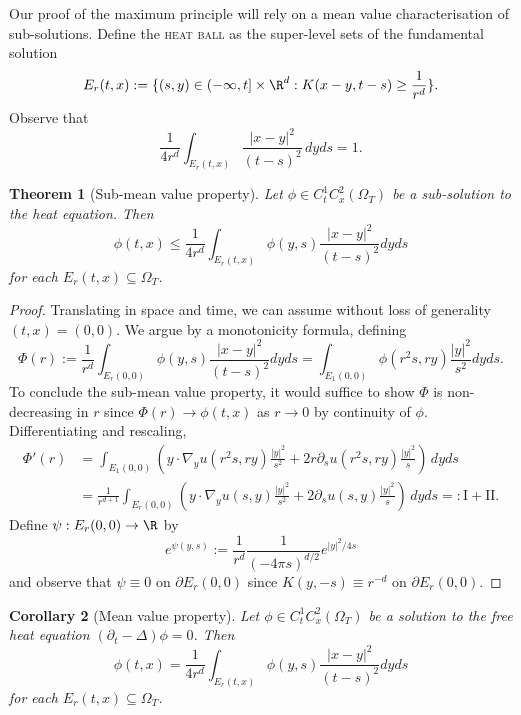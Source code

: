 \documentclass[reqno]{amsart}
\newtheorem{theorem}{Theorem}
\newtheorem{corollary}[theorem]{Corollary}
\theoremstyle{definition}
\theoremstyle{remark}
\renewcommand{\emph}{\textsc}
\begin{document}
Our proof of the maximum principle will rely on a mean value characterisation of sub-solutions. Define the \emph{heat ball} as the super-level sets of the fundamental solution 
	\[ E_r (t, x) := \{ (s, y) \in (-\infty, t] \times \R^d : K(x - y, t - s) \geq \frac{1}{r^d} \}. \]
Observe that 
	\[ \frac{1}{4r^d}\int_{E_r (t, x)} \frac{|x - y|^2}{(t - s)^2} \, dy ds = 1. \]	

\begin{theorem}[Sub-mean value property]
	Let $\phi \in C^1_t C^2_x (\Omega_T)$ be a sub-solution to the heat equation. Then 
		\[ \phi(t, x) \leq \frac{1}{4r^d} \int_{E_r (t, x)} \phi(y, s) \frac{|x - y|^2}{(t - s)^2} dy ds \]
	for each $E_{r} (t, x) \subseteq \Omega_T$. 	
\end{theorem}

\begin{proof}
	Translating in space and time, we can assume without loss of generality $(t, x) = (0, 0)$. We argue by a monotonicity formula, defining
		\[ \Phi(r) := \frac{1}{r^d} \int_{E_r (0, 0)} \phi(y, s) \frac{|x - y|^2}{(t - s)^2} dy ds = \int_{E_1 (0, 0)} \phi(r^2 s, ry) \frac{|y|^2}{s^2} dy ds . \]
	To conclude the sub-mean value property, it would suffice to show $\Phi$ is non-decreasing in $r$ since $\Phi(r) \to \phi(t, x)$ as $r \to 0$ by continuity of $\phi$. Differentiating and rescaling,
		\begin{align*}
			\Phi'(r)
				&= \int_{E_1 (0, 0)} \left(y \cdot \nabla_y u (r^2 s, r y)   \frac{|y|^2}{s^2} + 2r \partial_s u (r^2 s, ry)  \frac{|y|^2}{s}\right)  \, dy ds \\
				&= \frac{1}{r^{d + 1}} \int_{E_r (0, 0)} \left(y \cdot \nabla_y u (s, y) \frac{|y|^2}{s^2}  + 2 \partial_s u (s, y) \frac{|y|^2}{s}  \right) \, dy ds =: \text{I} + \text{II}.
		\end{align*}
	Define $\psi : E_r (0, 0) \to \R$ by 
		\[ e^{\psi (y, s)} := \frac{1}{r^d} \frac{1}{(-4\pi s)^{d/2}} e^{|y|^2/4s}\]
	and observe that $\psi \equiv 0$ on $\partial E_r (0, 0)$ since $K(y, -s) \equiv r^{-d}$ on $\partial E_r (0, 0)$. 
\end{proof}

\begin{corollary}[Mean value property]
	Let $\phi \in C^1_t C^2_x (\Omega_T)$ be a solution to the free heat equation $(\partial_t - \Delta) \phi = 0$. Then 
		\[ \phi(t, x) = \frac{1}{4r^d} \int_{E_r (t, x)} \phi(y, s) \frac{|x - y|^2}{(t - s)^2} dy ds \]
	for each $E_{r} (t, x) \subseteq \Omega_T$. 	
\end{corollary}
\end{document}
